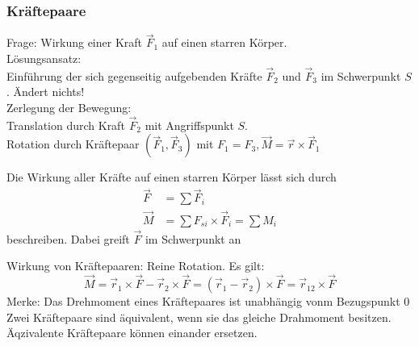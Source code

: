 \documentclass[a4paper]{scrartcl}
\renewcommand{\v}[1]{\vec{#1}}
\theoremstyle{definition}
\theoremstyle{plain}
\theoremstyle{plain}
\theoremstyle{remark}
\theoremstyle{remark}
\theoremstyle{remark}
\begin{document}
\subsubsection{Kräftepaare}
\label{sec-8-2-2}
Frage: Wirkung einer Kraft $\v F_1$ auf einen starren Körper. \\
    Lösungsansatz: \\
    Einführung der sich gegenseitig aufgebenden Kräfte $\v F_2$ und $\v F_3$ im Schwerpunkt $S$. Ändert nichts! \\
    Zerlegung der Bewegung: \\
    Translation durch Kraft $\v F_2$ mit Angriffspunkt $S$. \\
    Rotation durch Kräftepaar $(\v F_1, \v F_3)$ mit $F_1 = F_3, \v M = \v r \times \v F_1$

Die Wirkung aller Kräfte auf einen starren Körper lässt sich durch
\begin{align*}
\v F &= \sum \v F_i \tag{Gesamtkraft (Gesamtkraft)} \\
\v M &= \sum F_{si} \times \v F_i = \sum M_i \tag{Gesamtdrehmoment (Rotation)}
\end{align*}
beschreiben. Dabei greift $\v F$ im Schwerpunkt an

Wirkung von Kräftepaaren: Reine Rotation. Es gilt:
\[\v M = \v r_1 \times \v F - \v r_2 \times \v F = (\v r_1 - \v r_2)\times \v F = \v r_{12} \times \v F\]
Merke:
Das Drehmoment eines Kräftepaares ist unabhängig vonm Bezugspunkt $0$ \\
    Zwei Kräftepaare sind äquivalent, wenn sie das gleiche Drahmoment besitzen. Äqzivalente Kräftepaare können einander ersetzen.
\end{document}
